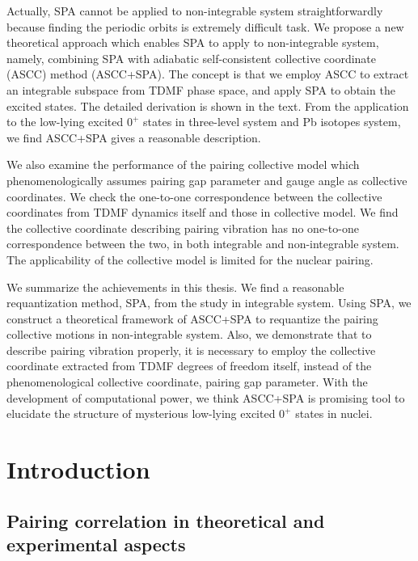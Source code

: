 \documentclass[11pt]{book} %
\begin{document}
Actually, SPA cannot be applied to non-integrable system straightforwardly because finding the periodic orbits is extremely difficult task. We propose a new theoretical approach which enables SPA to apply to non-integrable system, namely, combining SPA with adiabatic self-consistent collective coordinate (ASCC) method (ASCC+SPA). The concept is that we employ ASCC to extract an integrable subspace from TDMF phase space, and apply SPA to obtain the excited states. The detailed derivation is shown in the text.
From the application to the low-lying excited $0^+$ states in three-level system and Pb isotopes system, we find ASCC+SPA gives a reasonable description. 

We also examine the performance of the pairing collective model which phenomenologically assumes pairing gap parameter and gauge angle as collective coordinates. We check the one-to-one correspondence between the collective coordinates from TDMF dynamics itself and those in collective model. We find the collective coordinate describing pairing vibration has no one-to-one correspondence between the two, in both integrable and non-integrable system. The applicability of the collective model is limited for the nuclear pairing.

We summarize the achievements in this thesis. We find a reasonable requantization method, SPA, from the study in integrable system. Using SPA, we construct a theoretical framework of ASCC+SPA to requantize the pairing collective motions in non-integrable system. Also, we demonstrate that to describe pairing vibration properly, it is necessary to employ the collective coordinate extracted from TDMF degrees of freedom itself, instead of the phenomenological collective coordinate, pairing gap parameter. With the development of computational power, we think 
ASCC+SPA is promising tool to elucidate the structure of mysterious low-lying excited $0^+$ states in nuclei.

\thispagestyle{empty}

\setcounter{page}{-1}
\tableofcontents

\chapter{Introduction}

\section{Pairing correlation in theoretical and experimental aspects}
\end{document}
